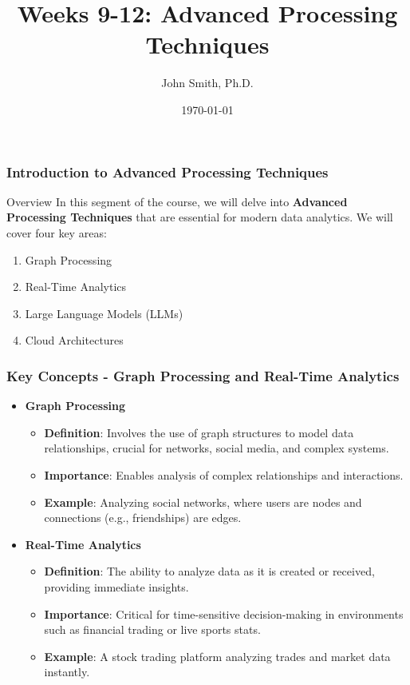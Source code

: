 \documentclass[aspectratio=169]{beamer}
\title[Advanced Processing Techniques]{Weeks 9-12: Advanced Processing Techniques}
\author[J. Smith]{John Smith, Ph.D.}
\institute[University Name]{
  Department of Computer Science\\
  University Name\\
  \vspace{0.3cm}
  Email: email@university.edu\\
  Website: www.university.edu
}
\date{\today}
\begin{document}
\frame{\titlepage}

\begin{frame}[fragile]
    \frametitle{Introduction to Advanced Processing Techniques}
    \begin{block}{Overview}
        In this segment of the course, we will delve into \textbf{Advanced Processing Techniques} that are essential for modern data analytics. We will cover four key areas:
    \end{block}
    \begin{enumerate}
        \item Graph Processing
        \item Real-Time Analytics
        \item Large Language Models (LLMs)
        \item Cloud Architectures
    \end{enumerate}
\end{frame}

\begin{frame}[fragile]
    \frametitle{Key Concepts - Graph Processing and Real-Time Analytics}
    \begin{itemize}
        \item \textbf{Graph Processing}
        \begin{itemize}
            \item \textbf{Definition}: Involves the use of graph structures to model data relationships, crucial for networks, social media, and complex systems.
            \item \textbf{Importance}: Enables analysis of complex relationships and interactions.
            \item \textbf{Example}: Analyzing social networks, where users are nodes and connections (e.g., friendships) are edges.
        \end{itemize}
        
        \item \textbf{Real-Time Analytics}
        \begin{itemize}
            \item \textbf{Definition}: The ability to analyze data as it is created or received, providing immediate insights.
            \item \textbf{Importance}: Critical for time-sensitive decision-making in environments such as financial trading or live sports stats.
            \item \textbf{Example}: A stock trading platform analyzing trades and market data instantly.
        \end{itemize}
    \end{itemize}
\end{frame}
\end{document}
